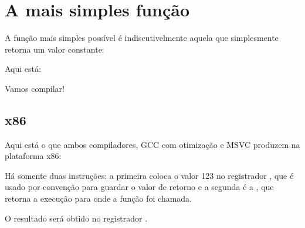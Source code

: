 \section{A mais simples função}

A função mais simples possível é indiscutivelmente aquela que simplesmente retorna um valor constante:

Aqui está:



Vamos compilar!

\subsection{x86}

Aqui está o que ambos compiladores, GCC com otimização e MSVC produzem na plataforma x86:



Há somente duas instruções: a primeira coloca o valor 123 no registrador \EAX, que é usado por convenção para guardar o valor de retorno e a segunda é a \RET, que retorna a execução para onde a função foi chamada.

O resultado será obtido no registrador \EAX.


